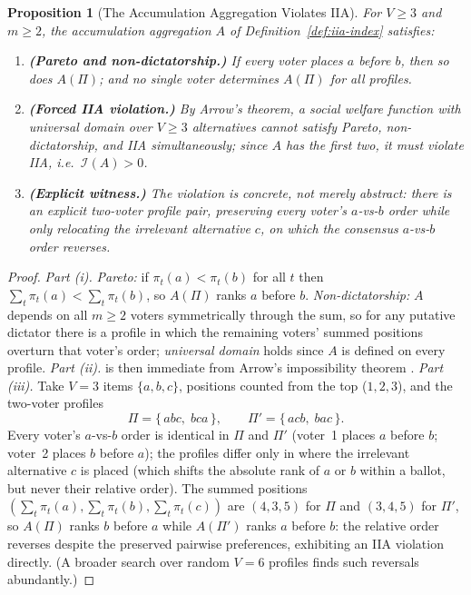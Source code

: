 \documentclass[12pt]{article}
\newtheorem{proposition}[theorem]{Proposition}
\begin{document}
\begin{proposition}[The Accumulation Aggregation Violates IIA]
\label{prop:iia-index}
For $V \geq 3$ and $m \geq 2$, the accumulation aggregation $A$ of Definition~\ref{def:iia-index} satisfies:
\begin{enumerate}[label=(\roman*)]
\item \textbf{(Pareto and non-dictatorship.)} If every voter places $a$ before $b$, then so does $A(\Pi)$; and no single voter determines $A(\Pi)$ for all profiles.

\item \textbf{(Forced IIA violation.)} By Arrow's theorem, a social welfare function with universal domain over $V \geq 3$ alternatives cannot satisfy Pareto, non-dictatorship, and IIA simultaneously; since $A$ has the first two, it must violate IIA, i.e.\ $\mathcal{I}(A) > 0$.

\item \textbf{(Explicit witness.)} The violation is concrete, not merely abstract: there is an explicit two-voter profile pair, preserving every voter's $a$-vs-$b$ order while only relocating the irrelevant alternative $c$, on which the consensus $a$-vs-$b$ order reverses.
\end{enumerate}
\end{proposition}

\begin{proof}
\textit{Part (i).}  \emph{Pareto:} if $\pi_t(a) < \pi_t(b)$ for all $t$ then $\sum_t \pi_t(a) < \sum_t \pi_t(b)$, so $A(\Pi)$ ranks $a$ before $b$.  \emph{Non-dictatorship:} $A$ depends on all $m \geq 2$ voters symmetrically through the sum, so for any putative dictator there is a profile in which the remaining voters' summed positions overturn that voter's order; \emph{universal domain} holds since $A$ is defined on every profile.
\textit{Part (ii).}  is then immediate from Arrow's impossibility theorem \citep{arrow1951social}.
\textit{Part (iii).}  Take $V=3$ items $\{a,b,c\}$, positions counted from the top ($1,2,3$), and the two-voter profiles
\[
\Pi = \{\,abc,\; bca\,\}, \qquad \Pi' = \{\,acb,\; bac\,\}.
\]
Every voter's $a$-vs-$b$ order is identical in $\Pi$ and $\Pi'$ (voter~1 places $a$ before $b$; voter~2 places $b$ before $a$); the profiles differ only in where the irrelevant alternative $c$ is placed (which shifts the absolute rank of $a$ or $b$ within a ballot, but never their relative order).  The summed positions $(\sum_t\pi_t(a),\sum_t\pi_t(b),\sum_t\pi_t(c))$ are $(4,3,5)$ for $\Pi$ and $(3,4,5)$ for $\Pi'$, so $A(\Pi)$ ranks $b$ before $a$ while $A(\Pi')$ ranks $a$ before $b$: the relative order reverses despite the preserved pairwise preferences, exhibiting an IIA violation directly.  (A broader search over random $V=6$ profiles finds such reversals abundantly.)
\end{proof}
\end{document}
